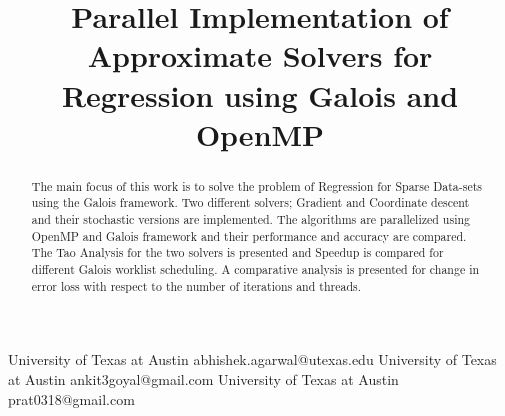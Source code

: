 \documentclass{sigplanconf}
\begin{document}
\setlength{\pdfpageheight}{\paperheight}
\setlength{\pdfpagewidth}{\paperwidth}






\title{Parallel Implementation of Approximate Solvers for Regression using Galois and OpenMP}

           {University of Texas at Austin}
           {abhishek.agarwal@utexas.edu}
           {University of Texas at Austin}
           {ankit3goyal@gmail.com}
           {University of Texas at Austin}
           {prat0318@gmail.com}

\maketitle

\begin{abstract}
The main focus of this work is to solve the problem of Regression for Sparse Data-sets using the Galois framework.
Two different solvers; Gradient and Coordinate descent and their stochastic versions are implemented. The
algorithms are parallelized using OpenMP and Galois framework and their performance and accuracy are compared.
The Tao Analysis for the two solvers is presented and Speedup is compared for different Galois worklist scheduling. A
comparative analysis is presented for change in error loss with respect to the number of iterations and threads. 
\end{abstract}

\end{document}

